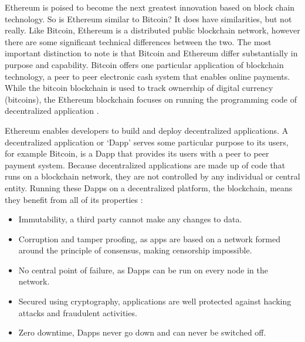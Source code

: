 \documentclass{article}
\begin{document}
Ethereum is poised to become the next greatest innovation based on block chain technology. So is Ethereum similar to Bitcoin? It does have similarities, but not really. Like Bitcoin, Ethereum is a distributed public blockchain network, however there are some significant technical differences between the two. The most important distinction to note is that Bitcoin and Ethereum differ substantially in purpose and capability. Bitcoin offers one particular application of blockchain technology, a peer to peer electronic cash system that enables online payments. While the bitcoin blockchain is used to track ownership of digital currency (bitcoins), the Ethereum blockchain focuses on running the programming code of decentralized application \citep{55_what_is_ethereum_a_step-by-step_beginners_guide_2017}.

Ethereum enables developers to build and deploy decentralized applications. A decentralized application or `Dapp' serves some particular purpose to its users, for example Bitcoin, is a Dapp that provides its users with a peer to peer payment system. Because decentralized applications are made up of code that runs on a blockchain network, they are not controlled by any individual or central entity. Running these Dapps on a decentralized platform, the blockchain, means they benefit from all of its properties \citep{54_ethereum_explained_2017}:

\begin{itemize}
	\item Immutability, a third party cannot make any changes to data.

	\item Corruption and tamper proofing, as apps are based on a network formed around the principle of consensus, making censorship impossible.

	\item No central point of failure, as Dapps can be run on every node in the network.

	\item Secured using cryptography, applications are well protected against hacking attacks and fraudulent activities.

	\item Zero downtime, Dapps never go down and can never be switched off.

\end{itemize}

\clearpage
\end{document}
